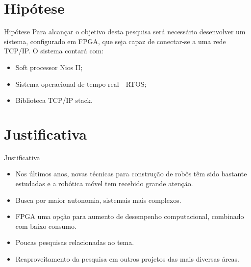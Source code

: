 \documentclass[10pt]{beamer}
\begin{document}
\section{Hipótese}
{
\begin{frame}{Hipótese}
	Para alcançar o objetivo desta pesquisa será necessário desenvolver um sistema, configurado em FPGA, que seja capaz de conectar-se a uma rede TCP/IP. O sistema contará com:
	\begin{itemize}
		\item Soft processor Nios II;
		\item Sistema operacional de tempo real - RTOS;
		\item Biblioteca TCP/IP stack.
	\end{itemize}

\end{frame}
}





\section{Justificativa}


\begin{frame}[fragile]{Justificativa}
    \begin{itemize}
        \item Nos últimos anos, novas técnicas para construção de robôs têm sido bastante estudadas e a robótica móvel tem recebido grande atenção.
        
        \item Busca por maior autonomia, sistemais mais complexos.
        
        \item FPGA uma opção para aumento de desempenho computacional, combinado com baixo consumo.
        
        \item Poucas pesquisas relacionadas ao tema.
        
        \item Reaproveitamento da pesquisa em outros projetos das mais diversas áreas.
    \end{itemize}
        

\end{frame}
\end{document}
